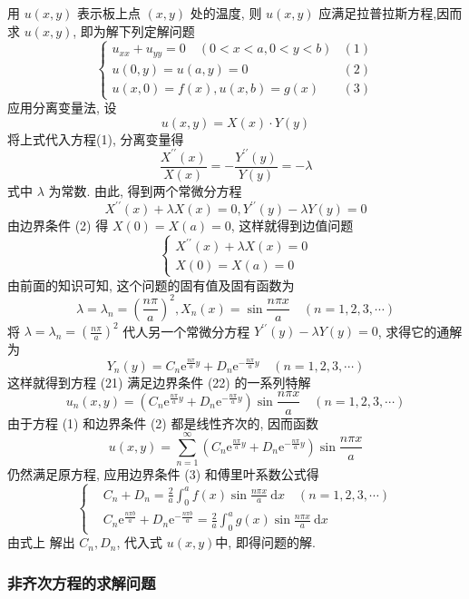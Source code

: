 用 $ u(x, y) $ 表示板上点 $ (x, y) $ 处的温度, 则 $ u(x, y) $ 应满足拉普拉斯方程,因而求 $ u(x, y) $, 即为解下列定解问题
$$
\left.\left\{\begin{array}{ll}
u_{x x}+u_{y y}=0 \quad(0<x<a, 0<y<b)& (1)\\
u(0, y)=u(a, y)=0 &(2)\\
u(x, 0)=f(x), u(x, b)=g(x)&(3)
\end{array}\right.\right.
$$
应用分离变量法, 设
$$
u(x, y)=X(x) \cdot Y(y)
$$
将上式代入方程(1), 分离变量得
$$
\frac{X^{\prime \prime}(x)}{X(x)}=-\frac{Y^{\prime \prime}(y)}{Y(y)}=-\lambda
$$
式中 $ \lambda $ 为常数. 由此, 得到两个常微分方程
$$
X^{\prime \prime}(x)+\lambda X(x)=0, Y^{\prime \prime}(y)-\lambda Y(y)=0
$$
由边界条件 (2) 得 $ X(0)=X(a)=0 $, 这样就得到边值问题
$$
\left\{\begin{array}{l}
X^{\prime \prime}(x)+\lambda X(x)=0 \\
X(0)=X(a)=0
\end{array}\right.
$$
由前面的知识可知, 这个问题的固有值及固有函数为
$$
\lambda=\lambda_{n}=\left(\frac{n \pi}{a}\right)^{2}, X_{n}(x)=\sin \frac{n \pi x}{a} \quad(n=1,2,3, \cdots)
$$
将 $ \lambda=\lambda_{n}=\left(\frac{n \pi}{a}\right)^{2} $ 代人另一个常微分方程 $ Y^{\prime \prime}(y)-\lambda Y(y)=0 $, 求得它的通解为
$$
Y_{n}(y)=C_{n} \mathrm{e}^{\frac{n \pi}{a} y}+D_{n} \mathrm{e}^{-\frac{n \pi}{a} y} \quad(n=1,2,3, \cdots)
$$
这样就得到方程 (21) 满足边界条件 (22) 的一系列特解
$$
u_{n}(x, y)=\left(C_{n} \mathrm{e}^{\frac{n \pi}{a} y}+D_{n} \mathrm{e}^{-\frac{n \pi}{a} y}\right) \sin \frac{n \pi x}{a} \quad(n=1,2,3, \cdots)
$$
由于方程 (1) 和边界条件 (2) 都是线性齐次的, 因而函数
$$
u(x, y)=\sum_{n=1}^{\infty}\left(C_{n} \mathrm{e}^{\frac{n \pi}{a} y}+D_{n} \mathrm{e}^{-\frac{n \pi}{a} y}\right) \sin \frac{n \pi x}{a}
$$
仍然满足原方程, 应用边界条件 (3) 和傅里叶系数公式得
$$
\left\{\begin{aligned}
&C_{n}+D_{n}=\frac{2}{a} \int_{0}^{a} f(x) \sin \frac{n \pi x}{a} \mathrm{~d} x \quad(n=1,2,3, \cdots) \\
&C_{n} \mathrm{e}^{\frac{n \pi b}{a}}+D_{n} \mathrm{e}^{-\frac{n \pi b}{a}}=\frac{2}{a} \int_{0}^{a} g(x) \sin \frac{n \pi x}{a} \mathrm{~d} x
\end{aligned}\right.
$$
由式上 解出 $ C_{n} , D_{n} $, 代入式 $u(x,y)$中, 即得问题的解.




\subsubsection{非齐次方程的求解问题}

